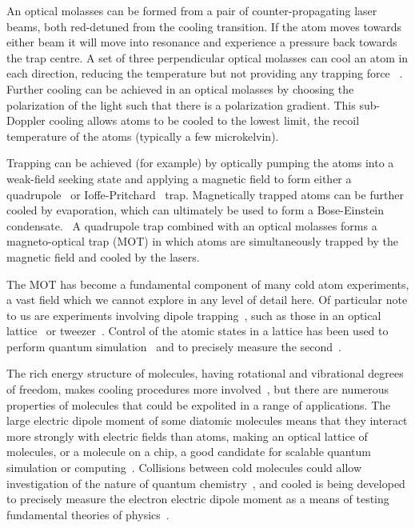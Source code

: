An optical molasses can be formed from a pair of counter-propagating laser
beams, both red-detuned from the cooling transition. If the atom moves towards
either beam it will move into resonance and experience a pressure back towards
the trap centre. A set of three perpendicular optical molasses can cool an atom
in each direction, reducing the temperature but not providing any trapping
force~\cite{Metcalf1999} . Further cooling can be achieved in an optical
molasses by choosing the polarization of the light such that there is a
polarization gradient. This sub-Doppler cooling allows atoms to be cooled to the
lowest limit, the recoil temperature of the atoms (typically a few
microkelvin).~\cite{Dalibard:89}

Trapping can be achieved (for example) by optically pumping the atoms into a
weak-field seeking state and applying a magnetic field to form either a
quadrupole~\cite{PhysRevLett.54.2596} or
Ioffe-Pritchard~\cite{PhysRevLett.51.1336} trap. Magnetically trapped atoms can
be further cooled by evaporation, which can ultimately be used to form a
Bose-Einstein condensate.~\cite{Anderson198} A quadrupole trap combined with an
optical molasses forms a magneto-optical trap (MOT) in which atoms are
simultaneously trapped by the magnetic field and cooled by the
lasers.~\cite{PhysRevLett.59.2631}

The MOT has become a fundamental component of many cold atom experiments, a vast
field which we cannot explore in any level of detail here. Of particular note to
us are experiments involving dipole trapping~\cite{PhysRevA.47.R4567}, such as
those in an optical lattice~\cite{Bakr2009} or tweezer~\cite{Ashkin:86}. Control
of the atomic states in a lattice has been used to perform quantum
simulation~\cite{Gross995} and to precisely measure the
second~\cite{Campbell90}.

The rich energy structure of molecules, having rotational and vibrational
degrees of freedom, makes cooling procedures more involved~\cite{Tarbutt2018},
but there are numerous properties of molecules that could be expolited in a
range of applications. The large electric dipole moment of some diatomic
molecules means that they interact more strongly with electric fields than
atoms, making an optical lattice of molecules, or a molecule on a chip, a good
candidate for scalable quantum simulation or computing~\cite{Micheli2006,
Andre2006}. Collisions between cold molecules could allow investigation of the
nature of quantum chemistry~\cite{Krems2008}, and cooled \YbF is being
developed to precisely measure the electron electric dipole moment as a means of
testing fundamental theories of physics~\cite{Lim2018}.

